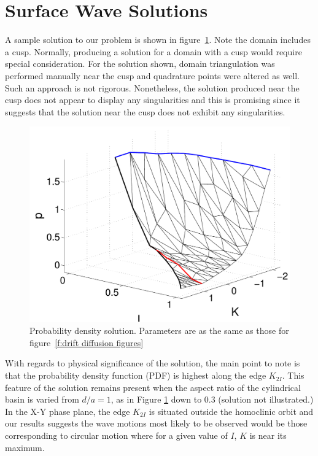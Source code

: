 \section{Surface Wave Solutions}

A sample solution to our problem is shown in figure~\ref{f:FEM solution}. Note the domain includes a cusp.
Normally, producing a solution for a domain with a cusp would require special consideration. For the solution shown, domain triangulation was performed manually near the cusp and quadrature points were altered as well. Such an approach is not rigorous. Nonetheless, the solution produced near the cusp does not appear to display any singularities and this is promising since it suggests that the solution near the cusp does not exhibit any singularities.

\begin{figure}
\begin{center}
\includegraphics[width=\textwidth*7/8]{figures/db3_surf}
\caption{Probability density solution. Parameters are as the same as those for figure~\ref{f:drift diffusion figures}}
\label{f:FEM solution}
\end{center}
\end{figure}

With regards to physical significance of the solution, the main point to note is that the probability density function (PDF) is highest along the edge $K_{2I}$. This feature of the solution remains present when the aspect ratio of the cylindrical basin is varied from $d/a = 1$, as in Figure \ref{f:FEM solution} down to 0.3 (solution not illustrated.) In the X-Y phase plane, the edge $K_{2I}$ is situated outside the homoclinic orbit and our results suggests the wave motions most likely to be observed would be those corresponding to circular motion where for a given value of $I$, $K$ is near its maximum.

